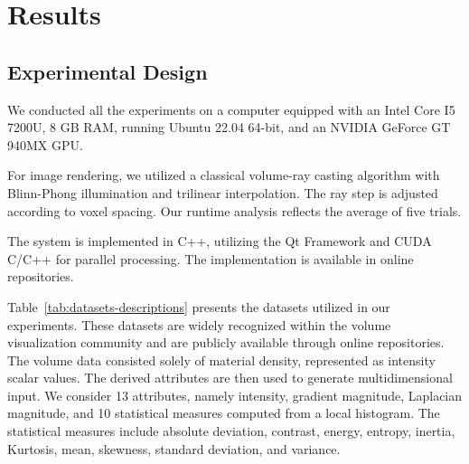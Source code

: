 \section{Results}
\label{sect:results}
\subsection{Experimental Design}
\label{subsect:experimental-design}

We conducted all the experiments on a computer equipped with an Intel Core I5 7200U, 8 GB RAM, running Ubuntu 22.04 64-bit, and an NVIDIA GeForce GT 940MX GPU. 

For image rendering, we utilized a classical volume-ray casting algorithm with Blinn-Phong illumination and trilinear interpolation. The ray step is adjusted according to voxel spacing. Our runtime analysis reflects the average of five trials. 

The system is implemented in C++, utilizing the Qt Framework and CUDA C/C++ for parallel processing. The implementation is available in online repositories.

Table~\ref{tab:datasets-descriptions} presents the datasets utilized in our experiments. These datasets are widely recognized within the volume visualization community and are publicly available through online repositories. The volume data consisted solely of material density, represented as intensity scalar values. The derived attributes are then used to generate multidimensional input. We consider 13 attributes, namely intensity, gradient magnitude, Laplacian magnitude, and 10 statistical measures computed from a local histogram. The statistical measures include absolute deviation, contrast, energy, entropy, inertia, Kurtosis, mean, skewness, standard deviation, and variance.


